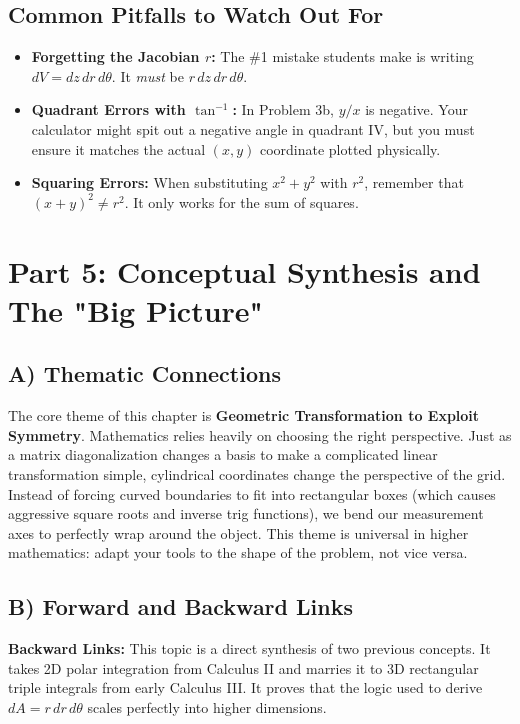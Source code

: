 \documentclass[11pt]{article}
\begin{document}
\subsection{Common Pitfalls to Watch Out For}
\begin{itemize}
    \item \textbf{Forgetting the Jacobian $r$:} The \#1 mistake students make is writing $dV = dz \, dr \, d\theta$. It \textit{must} be $r \, dz \, dr \, d\theta$.
    \item \textbf{Quadrant Errors with $\tan^{-1}$:} In Problem 3b, $y/x$ is negative. Your calculator might spit out a negative angle in quadrant IV, but you must ensure it matches the actual $(x,y)$ coordinate plotted physically.
    \item \textbf{Squaring Errors:} When substituting $x^2 + y^2$ with $r^2$, remember that $(x+y)^2 \neq r^2$. It only works for the sum of squares.
\end{itemize}

\newpage
\section{Part 5: Conceptual Synthesis and The "Big Picture"}

\subsection{A) Thematic Connections}
The core theme of this chapter is \textbf{Geometric Transformation to Exploit Symmetry}. Mathematics relies heavily on choosing the right perspective. Just as a matrix diagonalization changes a basis to make a complicated linear transformation simple, cylindrical coordinates change the perspective of the grid. Instead of forcing curved boundaries to fit into rectangular boxes (which causes aggressive square roots and inverse trig functions), we bend our measurement axes to perfectly wrap around the object. This theme is universal in higher mathematics: adapt your tools to the shape of the problem, not vice versa.

\subsection{B) Forward and Backward Links}
\textbf{Backward Links:} This topic is a direct synthesis of two previous concepts. It takes 2D polar integration from Calculus II and marries it to 3D rectangular triple integrals from early Calculus III. It proves that the logic used to derive $dA = r \, dr \, d\theta$ scales perfectly into higher dimensions.
\end{document}
